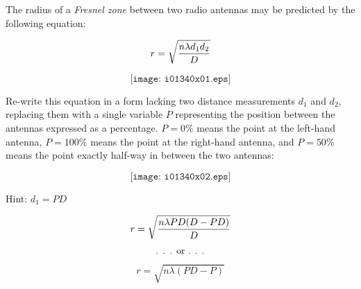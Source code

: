 

The radius of a {\it Fresnel zone} between two radio antennas may be predicted by the following equation:

$$r = \sqrt{{n \lambda d_1 d_2} \over D}$$

$$\texttt{[image: i01340x01.eps]}$$

Re-write this equation in a form lacking two distance measurements $d_1$ and $d_2$, replacing them with a single variable $P$ representing the position between the antennas expressed as a percentage.  $P=0\%$ means the point at the left-hand antenna, $P=100\%$ means the point at the right-hand antenna, and $P=50\%$ means the point exactly half-way in between the two antennas:

$$\texttt{[image: i01340x02.eps]}$$

\vskip 10pt

Hint: $d_1 = PD$

\vskip 10pt







$$r = \sqrt{{n \lambda PD (D - PD)} \over D}$$

$$\hbox{. . . or . . .}$$

$$r = \sqrt{n \lambda (PD - P)}$$











